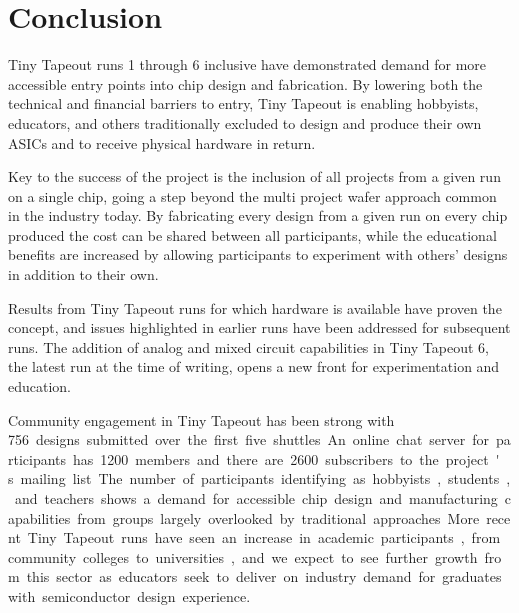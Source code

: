 \section{Conclusion}
\label{sec:conclusion}

Tiny Tapeout runs 1 through 6 inclusive have demonstrated demand for more accessible entry points into chip design and fabrication. By lowering both the technical and financial barriers to entry, Tiny Tapeout is enabling hobbyists, educators, and others traditionally excluded to design and produce their own ASICs and to receive physical hardware in return.

Key to the success of the project is the inclusion of all projects from a given run on a single chip, going a step beyond the multi project wafer approach common in the industry today. By fabricating every design from a given run on every chip produced the cost can be shared between all participants, while the educational benefits are increased by allowing participants to experiment with others' designs in addition to their own.

Results from Tiny Tapeout runs for which hardware is available have proven the concept, and issues highlighted in earlier runs have been addressed for subsequent runs. The addition of analog and mixed circuit capabilities in Tiny Tapeout 6, the latest run at the time of writing, opens a new front for experimentation and education.

Community engagement in Tiny Tapeout has been strong with \qty{756} designs submitted over the first five shuttles. An online chat server for participants has \qty{1200} members and there are \qty{2600} subscribers to the project's mailing list.

The number of participants identifying as hobbyists, students, and teachers shows a demand for accessible chip design and manufacturing capabilities from groups largely overlooked by traditional approaches. More recent Tiny Tapeout runs have seen an increase in academic participants, from community colleges to universities, and we expect to see further growth from this sector as educators seek to deliver on industry demand for graduates with semiconductor design experience.
